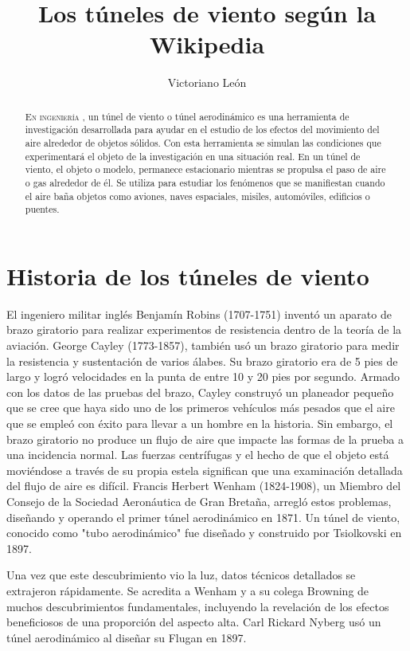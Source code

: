 \documentclass[10pt,a4paper]{article}
\author{Victoriano León}
\title{Los túneles de viento según la Wikipedia}
\begin{document}
\maketitle


\begin{abstract}
\lettrine{E}{n ingeniería}
, un túnel de viento o túnel aerodinámico es una herramienta de investigación desarrollada para ayudar en el estudio de los efectos del movimiento del aire alrededor de objetos sólidos. Con esta herramienta se simulan las condiciones que experimentará el objeto de la investigación en una situación real. En un túnel de viento, el objeto o modelo, permanece estacionario mientras se propulsa el paso de aire o gas alrededor de él. Se utiliza para estudiar los fenómenos que se manifiestan cuando el aire baña objetos como aviones, naves espaciales, misiles, automóviles, edificios o puentes.


\end {abstract}

\tableofcontents
\section{Historia de los túneles de viento}
El ingeniero militar inglés Benjamín Robins (1707-1751) inventó un aparato de brazo giratorio para realizar experimentos de resistencia dentro de la teoría de la aviación.
George Cayley (1773-1857), también usó un brazo giratorio para medir la resistencia y sustentación de varios álabes. Su brazo giratorio era de 5 pies de largo y logró velocidades en la punta de entre 10 y 20 pies por segundo. Armado con los datos de las pruebas del brazo, Cayley construyó un planeador pequeño que se cree que haya sido uno de los primeros vehículos más pesados que el aire que se empleó con éxito para llevar a un hombre en la historia. Sin embargo, el brazo giratorio no produce un flujo de aire que impacte las formas de la prueba a una incidencia normal. Las fuerzas centrífugas y el hecho de que el objeto está moviéndose a través de su propia estela significan que una examinación detallada del flujo de aire es difícil. Francis Herbert Wenham (1824-1908), un Miembro del Consejo de la Sociedad Aeronáutica de Gran Bretaña, arregló estos problemas, diseñando y operando el primer túnel aerodinámico en 1871.
Un túnel de viento, conocido como "tubo aerodinámico" fue diseñado y construido por Tsiolkovski en 1897.

Una vez que este descubrimiento vio la luz, datos técnicos detallados se extrajeron rápidamente. Se acredita a Wenham y a su colega Browning de muchos descubrimientos fundamentales, incluyendo la revelación de los efectos beneficiosos de una proporción del aspecto alta. Carl Rickard Nyberg usó un túnel aerodinámico al diseñar su Flugan en 1897.
\end{document}
